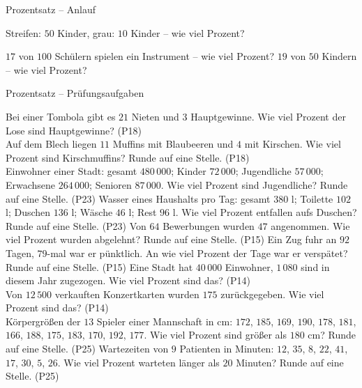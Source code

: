 \setcounter{aufgabe}{0}

\begin{aufgabe}{Prozentsatz – Anlauf}
\begin{teile}
\teil Streifen: $50$ Kinder, grau: $10$ Kinder – wie viel Prozent?

\teil $17$ von $100$ Schülern spielen ein Instrument – wie viel Prozent? \leerfeld[\%]
\teil $19$ von $50$ Kindern – wie viel Prozent? \leerfeld[\%]
\end{teile}
\end{aufgabe}

\begin{aufgabe}{Prozentsatz – Prüfungsaufgaben}
\begin{teile}
\teil Bei einer Tombola gibt es $21$ Nieten und $3$ Hauptgewinne. Wie viel Prozent der Lose sind Hauptgewinne? \hfill (P18) \\ \leerfeld[\%]
\teil Auf dem Blech liegen $11$ Muffins mit Blaubeeren und $4$ mit Kirschen. Wie viel Prozent sind Kirschmuffins? Runde auf eine Stelle. \hfill (P18) \\ \leerfeld[\%]
\teil Einwohner einer Stadt: gesamt $480\,000$; Kinder $72\,000$; Jugendliche $57\,000$; Erwachsene $264\,000$; Senioren $87\,000$. Wie viel Prozent sind Jugendliche? Runde auf eine Stelle. \hfill (P23)
\teil Wasser eines Haushalts pro Tag: gesamt $380$ l; Toilette $102$ l; Duschen $136$ l; Wäsche $46$ l; Rest $96$ l. Wie viel Prozent entfallen aufs Duschen? Runde auf eine Stelle. \hfill (P23)
\teil Von $64$ Bewerbungen wurden $47$ angenommen. Wie viel Prozent wurden abgelehnt? Runde auf eine Stelle. \hfill (P15)
\teil Ein Zug fuhr an $92$ Tagen, $79$-mal war er pünktlich. An wie viel Prozent der Tage war er verspätet? Runde auf eine Stelle. \hfill (P15)
\teil Eine Stadt hat $40\,000$ Einwohner, $1\,080$ sind in diesem Jahr zugezogen. Wie viel Prozent sind das? \hfill (P14) \\ \leerfeld[\%]
\teil Von $12\,500$ verkauften Konzertkarten wurden $175$ zurückgegeben. Wie viel Prozent sind das? \hfill (P14) \\ \leerfeld[\%]
\teil Körpergrößen der $13$ Spieler einer Mannschaft in cm: $172$, $185$, $169$, $190$, $178$, $181$, $166$, $188$, $175$, $183$, $170$, $192$, $177$. Wie viel Prozent sind größer als $180$ cm? Runde auf eine Stelle. \hfill (P25)
\teil Wartezeiten von $9$ Patienten in Minuten: $12$, $35$, $8$, $22$, $41$, $17$, $30$, $5$, $26$. Wie viel Prozent warteten länger als $20$ Minuten? Runde auf eine Stelle. \hfill (P25)
\end{teile}
\end{aufgabe}

\medskip
{}
